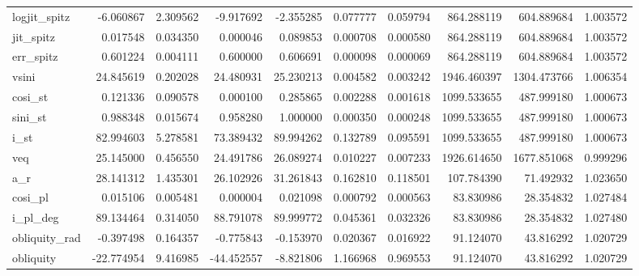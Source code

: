 \begin{tabular}{lrrrrrrrrr}
logjit\_spitz  &   -6.060867 &   2.309562 &   -9.917692 &   -2.355285 &   0.077777 &  0.059794 &   864.288119 &   604.889684 &  1.003572 \\
jit\_spitz     &    0.017548 &   0.034350 &    0.000046 &    0.089853 &   0.000708 &  0.000580 &   864.288119 &   604.889684 &  1.003572 \\
err\_spitz     &    0.601224 &   0.004111 &    0.600000 &    0.606691 &   0.000098 &  0.000069 &   864.288119 &   604.889684 &  1.003572 \\
vsini         &   24.845619 &   0.202028 &   24.480931 &   25.230213 &   0.004582 &  0.003242 &  1946.460397 &  1304.473766 &  1.006354 \\
cosi\_st       &    0.121336 &   0.090578 &    0.000100 &    0.285865 &   0.002288 &  0.001618 &  1099.533655 &   487.999180 &  1.000673 \\
sini\_st       &    0.988348 &   0.015674 &    0.958280 &    1.000000 &   0.000350 &  0.000248 &  1099.533655 &   487.999180 &  1.000673 \\
i\_st          &   82.994603 &   5.278581 &   73.389432 &   89.994262 &   0.132789 &  0.095591 &  1099.533655 &   487.999180 &  1.000673 \\
veq           &   25.145000 &   0.456550 &   24.491786 &   26.089274 &   0.010227 &  0.007233 &  1926.614650 &  1677.851068 &  0.999296 \\
a\_r           &   28.141312 &   1.435301 &   26.102926 &   31.261843 &   0.162810 &  0.118501 &   107.784390 &    71.492932 &  1.023650 \\
cosi\_pl       &    0.015106 &   0.005481 &    0.000004 &    0.021098 &   0.000792 &  0.000563 &    83.830986 &    28.354832 &  1.027484 \\
i\_pl\_deg      &   89.134464 &   0.314050 &   88.791078 &   89.999772 &   0.045361 &  0.032326 &    83.830986 &    28.354832 &  1.027480 \\
obliquity\_rad &   -0.397498 &   0.164357 &   -0.775843 &   -0.153970 &   0.020367 &  0.016922 &    91.124070 &    43.816292 &  1.020729 \\
obliquity     &  -22.774954 &   9.416985 &  -44.452557 &   -8.821806 &   1.166968 &  0.969553 &    91.124070 &    43.816292 &  1.020729 \\
\bottomrule
\end{tabular}
